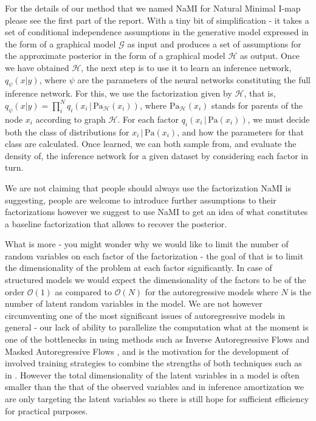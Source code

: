 \documentclass[12pt]{article}
\begin{document}
For the details of our method that we named NaMI for Natural Minimal I-map please see the first part of the report. 
With a tiny bit of simplification - it takes a set of conditional independence assumptions in the generative model expressed in the form of a graphical model $\mathcal{G}$ as input and produces a set of assumptions for the approximate posterior in the form of a graphical model $\mathcal{H}$ as output.
Once we have obtained $\mathcal{H}$, the next step is to use it to learn an inference network, $q_\psi(x|y)$, where $\psi$ are the parameters of the neural networks constituting the full inference network. 
For this, we use the factorization given by $\mathcal{H}$, that is, $q_\psi(x|y)=\prod^N_i q_i(x_i\,|\,\text{Pa}_\mathcal{H}(x_i))$, where $\text{Pa}_\mathcal{H}(x_i)$ stands for parents of the node $x_i$ according to graph $\mathcal{H}$.
For each factor $q_i(x_i\,|\,\text{Pa}(x_i))$, we must decide both the class of distributions for $x_i\,|\,\text{Pa}(x_i)$, and how the parameters for that class are calculated.
Once learned, we can both sample from, and evaluate the density of, the inference network for a given dataset by considering each factor in turn.

We are not claiming that people should always use the factorization NaMI is suggesting, people are welcome to introduce further assumptions to their factorizations however we suggest to use NaMI to get an idea of what constitutes a baseline factorization that allows to recover the posterior.

What is more - you might wonder why we would like to limit the number of random variables on each factor of the factorization - the goal of that is to limit the dimensionality of the problem at each factor significantly.
In case of structured models we would expect the dimensionality of the factors to be of the order $\mathcal{O}(1)$ as compared to $\mathcal{O}(N)$ for the autoregressive models where $N$ is the number of latent random variables in the model.
We are not however circumventing one of the most significant issues of autoregressive models in general - our lack of ability to parallelize the computation what at the moment is one of the bottlenecks in using methods such as Inverse Autoregressive Flows \citep{IAF} and Masked Autoregressive Flows \citep{MAF}, and is the motivation for the development of involved training strategies to combine the strengths of both techniques such as in \citep{ParallelWavenet}.
However the total dimensionality of the latent variables in a model is often smaller than the that of the observed variables and in inference amortization we are only targeting the latent variables so there is still hope for sufficient efficiency for practical purposes.
\end{document}
